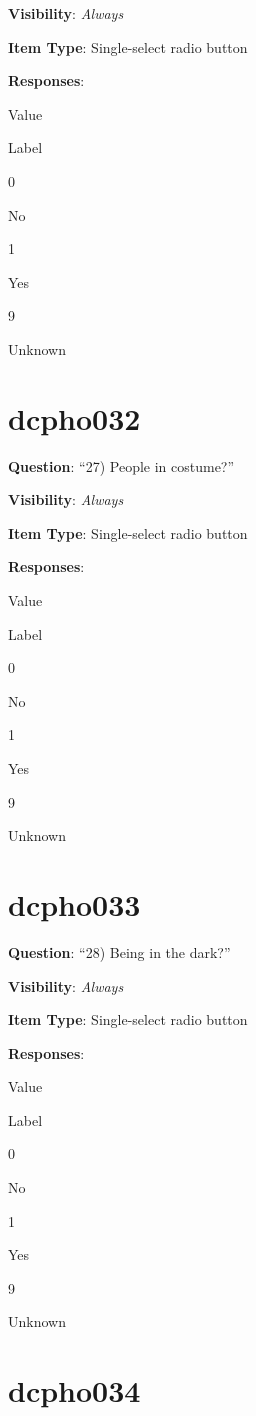\documentclass[]{book}
\begin{document}
\textbf{Visibility}: \emph{Always}

\textbf{Item Type}: Single-select radio button

\textbf{Responses}:

Value

Label

0

No

1

Yes

9

Unknown

\hypertarget{dcpho032}{%
\section{dcpho032}\label{dcpho032}}

\textbf{Question}: ``27) People in costume?''

\textbf{Visibility}: \emph{Always}

\textbf{Item Type}: Single-select radio button

\textbf{Responses}:

Value

Label

0

No

1

Yes

9

Unknown

\hypertarget{dcpho033}{%
\section{dcpho033}\label{dcpho033}}

\textbf{Question}: ``28) Being in the dark?''

\textbf{Visibility}: \emph{Always}

\textbf{Item Type}: Single-select radio button

\textbf{Responses}:

Value

Label

0

No

1

Yes

9

Unknown

\hypertarget{dcpho034}{%
\section{dcpho034}\label{dcpho034}}
\end{document}
